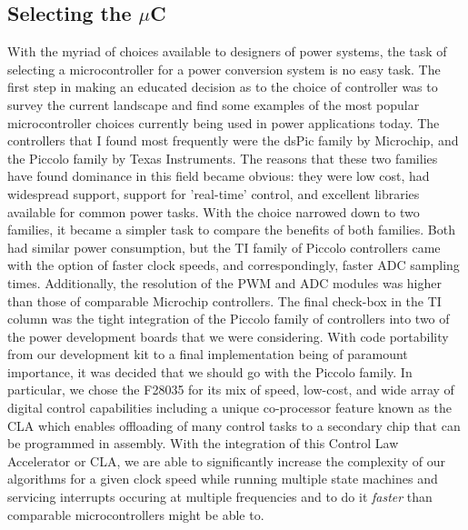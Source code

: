 \subsection{Selecting the $\mu$C}
With the myriad of choices available to designers of power systems, the task of selecting a microcontroller for a power conversion system is no easy task. The first step in making an educated decision as to the choice of controller was to survey the current landscape and find some examples of the most popular microcontroller choices currently being used in power applications today. The controllers that I found most frequently were the dsPic family by Microchip, and the Piccolo family by Texas Instruments. The reasons that these two families have found dominance in this field became obvious: they were low cost, had widespread support, support for 'real-time' control, and excellent libraries available for common power tasks. With the choice narrowed down to two families, it became a simpler task to compare the benefits of both families. Both had similar power consumption, but the TI family of Piccolo controllers came with the option of faster clock speeds, and correspondingly, faster ADC sampling times. Additionally, the resolution of the PWM and ADC modules was higher than those of comparable Microchip controllers. The final check-box in the TI column was the tight integration of the Piccolo family of controllers into two of the power development boards that we were considering. With code portability from our development kit to a final implementation being of paramount importance, it was decided that we should go with the Piccolo family. In particular, we chose the F28035 for its mix of speed, low-cost, and wide array of digital control capabilities including a unique co-processor feature known as the CLA which enables offloading of many control tasks to a secondary chip that can be programmed in assembly. With the integration of this Control Law Accelerator or CLA, we are able to significantly increase the complexity of our algorithms for a given clock speed while running multiple state machines and servicing interrupts occuring at multiple frequencies and to do it \emph{faster} than comparable microcontrollers might be able to.

